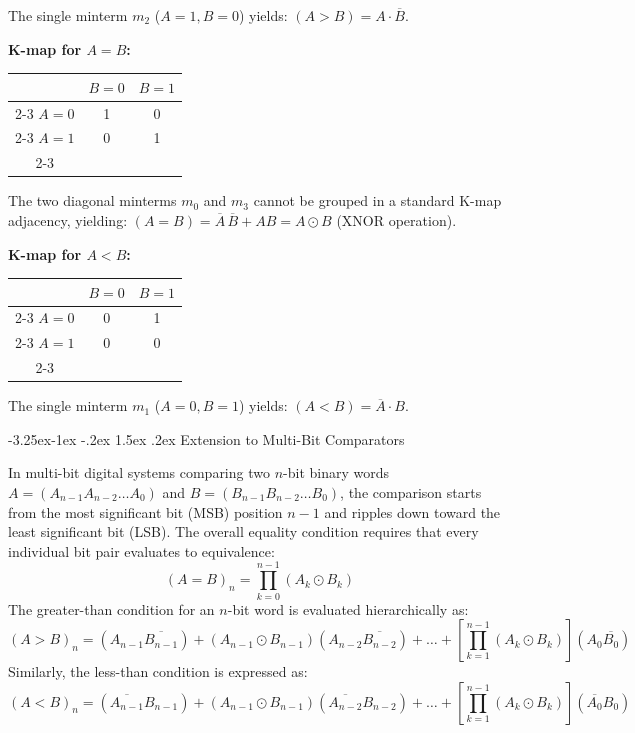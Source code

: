 \documentclass[12pt,a4paper,oneside]{report}
\makeatletter
\renewcommand\subsection{\@startsection{subsection}{2}{\z@}%
                                     {-3.25ex\@plus -1ex \@minus -.2ex}%
                                     {1.5ex \@plus .2ex}%
                                     {\normalfont\normalsize\bfseries\itshape}}
\makeatother
\begin{document}
\noindent The single minterm $m_2$ ($A=1, B=0$) yields: $(A > B) = A \cdot \overline{B}$.

\noindent\textbf{K-map for $A = B$:}

\begin{center}
\begin{tabular}{c|c|c|}
\multicolumn{1}{c}{} & \multicolumn{1}{c}{$B=0$} & \multicolumn{1}{c}{$B=1$} \\
\cline{2-3}
$A=0$ & 1 & 0 \\
\cline{2-3}
$A=1$ & 0 & 1 \\
\cline{2-3}
\end{tabular}
\end{center}

\noindent The two diagonal minterms $m_0$ and $m_3$ cannot be grouped in a standard K-map adjacency, yielding: $(A = B) = \overline{A}\,\overline{B} + AB = A \odot B$ (XNOR operation).

\noindent\textbf{K-map for $A < B$:}

\begin{center}
\begin{tabular}{c|c|c|}
\multicolumn{1}{c}{} & \multicolumn{1}{c}{$B=0$} & \multicolumn{1}{c}{$B=1$} \\
\cline{2-3}
$A=0$ & 0 & 1 \\
\cline{2-3}
$A=1$ & 0 & 0 \\
\cline{2-3}
\end{tabular}
\end{center}

\noindent The single minterm $m_1$ ($A=0, B=1$) yields: $(A < B) = \overline{A} \cdot B$.

\subsection{Extension to Multi-Bit Comparators}

In multi-bit digital systems comparing two $n$-bit binary words $A = (A_{n-1} A_{n-2} \dots A_0)$ and $B = (B_{n-1} B_{n-2} \dots B_0)$, the comparison starts from the most significant bit (MSB) position $n-1$ and ripples down toward the least significant bit (LSB). The overall equality condition requires that every individual bit pair evaluates to equivalence:
\begin{equation}
(A = B)_n = \prod_{k=0}^{n-1} (A_k \odot B_k)
\end{equation}
The greater-than condition for an $n$-bit word is evaluated hierarchically as:
\begin{equation}
(A > B)_n = (A_{n-1} \overline{B_{n-1}}) + (A_{n-1} \odot B_{n-1})(A_{n-2} \overline{B_{n-2}}) + \dots + \left[\prod_{k=1}^{n-1} (A_k \odot B_k)\right](A_0 \overline{B_0})
\end{equation}
Similarly, the less-than condition is expressed as:
\begin{equation}
(A < B)_n = (\overline{A_{n-1}} B_{n-1}) + (A_{n-1} \odot B_{n-1})(\overline{A_{n-2}} B_{n-2}) + \dots + \left[\prod_{k=1}^{n-1} (A_k \odot B_k)\right](\overline{A_0} B_0)
\end{equation}
\end{document}
